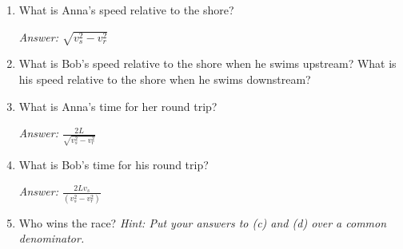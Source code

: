 \begin{enumerate}[labparts]

\item What is Anna's speed relative to the shore?
\answerspace{0.6in}

\hspace{\fill}\textit{Answer: $\sqrt{v_s^2-v_r^2}$}

\item What is Bob's speed relative to the shore when he swims upstream?  What is his speed relative to the shore when he swims downstream?
\answerspace{0.6in}


\item What is Anna's time for her round trip?
\answerspace{0.6in}

\hspace{\fill}\textit{Answer: $\displaystyle \frac{2L}{\sqrt{v_s^2-v_r^2}}$}

\item What is Bob's time for his round trip?
\answerspace{0.6in}

\hspace{\fill}\textit{Answer: $\displaystyle \frac{2Lv_s}{(v_s^2-v_r^2)}$}

\item Who wins the race? \textit{Hint: Put your answers to (c) and (d) over a common denominator.}
\answerspace{0.8in}

\end{enumerate}
